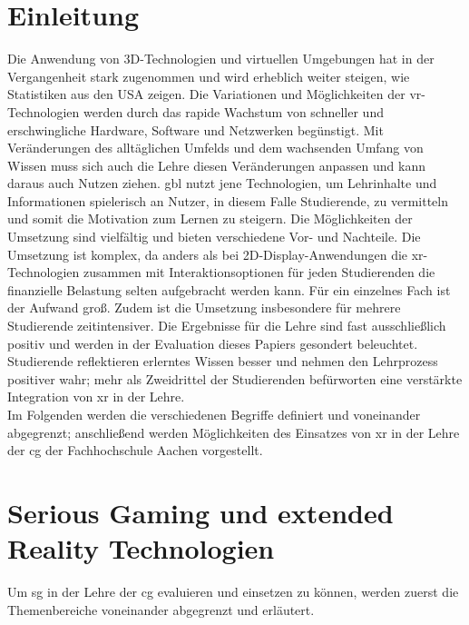\documentclass[conference]{IEEEtran}
\begin{document}
\section{Einleitung}
Die Anwendung von 3D-Technologien und virtuellen Umgebungen hat in der Vergangenheit stark zugenommen
und wird erheblich weiter steigen, wie Statistiken aus den USA zeigen\cite{eduxrvrar2020usa}.
Die Variationen und Möglichkeiten der \gls{vr}-Technologien werden durch das rapide Wachstum von schneller und erschwingliche Hardware, Software und Netzwerken begünstigt\cite{evallearningmixedreality2020}.
Mit Veränderungen des alltäglichen Umfelds und dem wachsenden Umfang von Wissen muss sich auch die Lehre diesen Veränderungen anpassen und kann daraus auch
Nutzen ziehen.
\gls{gbl} nutzt jene Technologien, um Lehrinhalte und Informationen spielerisch an Nutzer, in diesem Falle Studierende, zu vermitteln und somit die
Motivation zum Lernen zu steigern.
Die Möglichkeiten der Umsetzung sind vielfältig und bieten verschiedene Vor- und Nachteile.
Die Umsetzung ist komplex, da anders als bei 2D-Display-Anwendungen die \gls{xr}-Technologien zusammen mit Interaktionsoptionen für jeden Studierenden
die finanzielle Belastung selten aufgebracht werden kann. Für ein einzelnes Fach ist der Aufwand groß. Zudem ist die Umsetzung insbesondere für mehrere Studierende zeitintensiver.
Die Ergebnisse für die Lehre sind fast ausschließlich positiv und werden in der Evaluation dieses Papiers gesondert beleuchtet.
Studierende reflektieren erlerntes Wissen besser und nehmen den Lehrprozess positiver wahr;
mehr als Zweidrittel der Studierenden befürworten eine verstärkte Integration von \gls{xr} in der Lehre\cite{a7}.\\


Im Folgenden werden die verschiedenen Begriffe definiert und voneinander abgegrenzt;
anschließend werden Möglichkeiten des Einsatzes von \gls{xr} in der Lehre der \gls{cg} der Fachhochschule Aachen vorgestellt.


\section{Serious Gaming und extended Reality Technologien}

Um \gls{sg} in der Lehre der \gls{cg} evaluieren und einsetzen zu können, werden zuerst die Themenbereiche voneinander abgegrenzt und erläutert.
\end{document}
